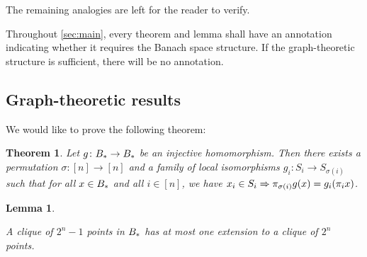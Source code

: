 \documentclass{amsart}
\newtheorem{theorem}{Theorem}[section]
\newtheorem{lemma}{Lemma}[section]
\theoremstyle{definition}
\begin{document}
The remaining analogies are left for the reader to verify.

Throughout \autoref{sec:main}, every theorem and lemma shall have an annotation indicating whether it requires the Banach space structure. If the graph-theoretic structure is sufficient, there will be no annotation.

\subsection{Graph-theoretic results}

We would like to prove the following theorem:

\begin{theorem} \label{thm:factors}
Let $g  \colon  B_* \to B_*$ be an injective homomorphism. Then there exists a permutation $\sigma \colon  [n]\to[n]$ and a family of local isomorphisms $g_i  \colon  S_i \to S_{\sigma(i)}$ such that for all $x \in B_*$ and all $i \in [n]$, we have $x_i \in S_i \Rightarrow \pi_{\sigma(i)}g(x) = g_i (\pi_i x)$.\end{theorem}

\begin{lemma} \label{lem:clique-ext}

  A clique of $2^n-1$ points in $B_*$ has at most one extension
to a clique of $2^n$ points.
\end{lemma}
\end{document}
